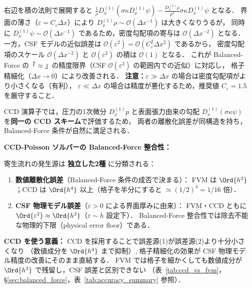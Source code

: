 右辺を積の法則で展開すると $\frac{1}{\rho}D_x^{(1)}(\sigma\kappa D_x^{(1)}\psi) - \frac{D_x^{(1)}\rho}{\rho^2}\sigma\kappa D_x^{(1)}\psi$ となる．
界面の薄さ（$\varepsilon = C_\varepsilon\Delta x$）により $D_x^{(1)}\rho \sim \mathcal{O}(\Delta x^{-1})$ は大きくなりうるが，
同時に $D_x^{(1)}\psi \sim \mathcal{O}(\Delta x^{-1})$ であるため，密度勾配項の寄与は $\mathcal{O}(\Delta x^{-2})$
となる．一方，CSF モデルの近似誤差は $\mathcal{O}(\varepsilon^2) = \mathcal{O}(C_\varepsilon^2 \Delta x^2)$ であるから，
密度勾配項のスケール $\mathcal{O}(\Delta x^{-2})$ と $\mathcal{O}(\varepsilon^2)$ の積は $\mathcal{O}(1)$ となる．
これが Balanced-Force の「$\approx$」の精度限界（CSF $\mathcal{O}(\varepsilon^2)$ の範囲内での近似）に対応し，
格子精細化（$\Delta x \to 0$）により改善される．
\textbf{注意：}$\varepsilon \gg \Delta x$ の場合は密度勾配項がより小さくなる（有利），
$\varepsilon \ll \Delta x$ の場合は精度が悪化するため，推奨値 $C_\varepsilon = 1.5$ を厳守すること．

CCD 演算子では，圧力の1次微分 $D_x^{(1)} p$ と表面張力由来の勾配
$D_x^{(1)}(\sigma\kappa\psi)$ を\textbf{同一の CCD スキーム}で評価するため，
両者の離散化誤差が同構造を持ち，Balanced-Force 条件が自然に満足される．

\begin{tcolorbox}[resultbox]
\textbf{CCD-Poisson ソルバーの Balanced-Force 整合性：}

寄生流れの発生源は \textbf{独立した2種} に分類される：
\begin{enumerate}
  \item \textbf{数値離散化誤差}（Balanced-Force 条件の成否で決まる）：
        FVM は $\Ord{h^2}$；CCD は $\Ord{h^4}$ 以上（格子を半分にすると $\simeq (1/2)^4=1/16$ 倍）．
  \item \textbf{CSF 物理モデル誤差}（$\varepsilon>0$ による界面厚みに由来）：
        FVM・CCD ともに $\Ord{\varepsilon^2}\approx\Ord{h^2}$（$\varepsilon\sim h$ 設定下）．
        Balanced-Force 整合性では除去不能な物理的下限（physical error floor）である．
\end{enumerate}

\medskip
\noindent\textbf{CCD を使う意義：}
CCD を採用することで誤差源(1)が誤差源(2)より十分小さくなり
（数値成分を $\Ord{h^4}$ まで抑制）,
格子精細化の効果が CSF 物理モデル精度の改善にそのまま直結する．
FVM では格子を細かくしても数値成分が $\Ord{h^2}$ で残留し，CSF 誤差と区別できない
（表~\ref{tab:ccd_vs_fvm}，§\ref{sec:balanced_force}，表~\ref{tab:accuracy_summary} 参照）．
\end{tcolorbox}

